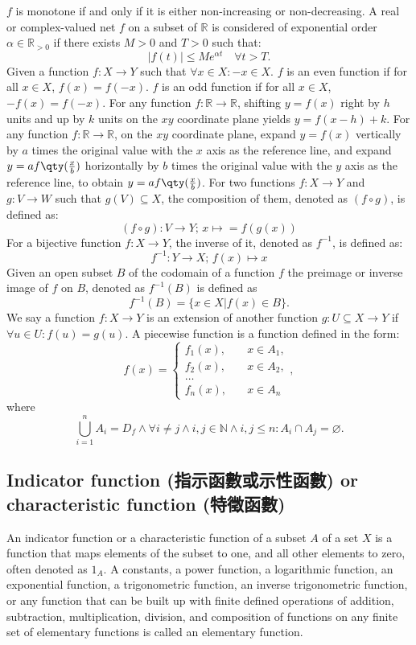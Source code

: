 \documentclass[a4paper,12pt]{report}
\begin{document}
$f$ is monotone if and only if it is either non-increasing or non-decreasing.
A real or complex-valued net $f$ on a subset of $\mathbb{R}$ is considered of exponential order $\alpha\in\mathbb{R}_{>0}$ if there exists $M>0$ and $T>0$ such that:
\[|f(t)|\leq Me^{\alpha t}\quad \forall t>T.\]
Given a function $f\colon X\to Y$ such that $\forall x\in X\colon -x\in X$.
$f$ is an even function if for all $x\in X$, $f(x)=f(-x)$.
$f$ is an odd function if for all $x\in X$, $-f(x)=f(-x)$.
For any function $f\colon\mathbb{R}\to\mathbb{R}$, shifting $y=f(x)$ right by $h$ units and up by $k$ units on the $xy$ coordinate plane yields $y=f(x-h)+k$.
For any function $f\colon\mathbb{R}\to\mathbb{R}$, on the $xy$ coordinate plane, expand $y=f(x)$ vertically by $a$ times the original value with the $x$ axis as the reference line, and expand $y=af\qty(\frac{x}{b})$ horizontally by $b$ times the original value with the $y$ axis as the reference line, to obtain $y=af\qty(\frac{x}{b})$.
For two functions $f\colon X\to Y$ and $g\colon V\to W$ such that $g(V)\subseteq X$, the composition of them, denoted as $(f\circ g)$, is defined as:
\[(f \circ g)\colon V\to Y;\,x\mapsto = f(g(x))\]
For a bijective function $f\colon X\to Y$, the inverse of it, denoted as $f^{-1}$, is defined as:
\[f^{-1}\colon Y\to X;\,f(x)\mapsto x\]
Given an open subset $B$ of the codomain of a function $f$ the preimage or inverse image of $f$ on $B$, denoted as $f^{-1}(B)$ is defined as
\[f^{-1}(B)=\{x\in X|f(x)\in B\}.\]
We say a function $f\colon X\to Y$ is an extension of another function $g\colon U\subseteq X\to Y$ if $\forall u\in U\colon f(u)=g(u)$.
A piecewise function is a function defined in the form:
\[f(x) =
\begin{cases}
f_1(x), & \quad x\in A_1, \\
f_2(x), & \quad x\in A_2, \\
\dots  \\
f_n(x), & \quad x \in A_n
\end{cases},\]
where
\[\bigcup_{i=1}^nA_i=D_f\land\forall i\neq j\land i,j\in\mathbb{N}\land i,j\leq n\colon A_i\cap A_j=\varnothing.\]
\subsection{Indicator function (指示函數或示性函數) or characteristic function (特徵函數)}
An indicator function or a characteristic function of a subset $A$ of a set $X$ is a function that maps elements of the subset to one, and all other elements to zero, often denoted as $1_A$.
A constants, a power function, a logarithmic function, an exponential function, a trigonometric function, an inverse trigonometric function, or any function that can be built up with finite defined operations of addition, subtraction, multiplication, division, and composition of functions on any finite set of elementary functions is called an elementary function.
\end{document}
